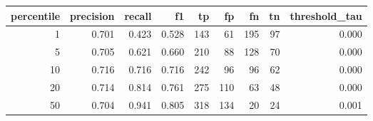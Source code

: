 \begin{tabular}{rrrrrrrrr}
\toprule
percentile & precision & recall & f1 & tp & fp & fn & tn & threshold\_tau \\
\midrule
1 & 0.701 & 0.423 & 0.528 & 143 & 61 & 195 & 97 & 0.000 \\
5 & 0.705 & 0.621 & 0.660 & 210 & 88 & 128 & 70 & 0.000 \\
10 & 0.716 & 0.716 & 0.716 & 242 & 96 & 96 & 62 & 0.000 \\
20 & 0.714 & 0.814 & 0.761 & 275 & 110 & 63 & 48 & 0.000 \\
50 & 0.704 & 0.941 & 0.805 & 318 & 134 & 20 & 24 & 0.001 \\
\bottomrule
\end{tabular}
